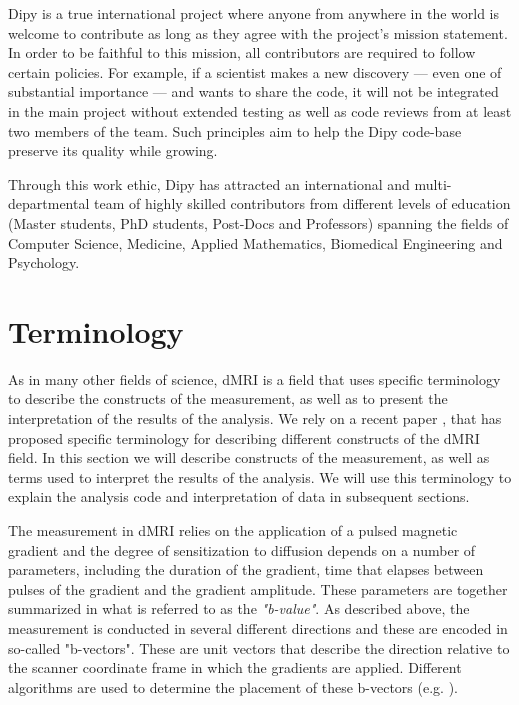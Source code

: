 \documentclass{bioinfo}
\begin{document}
Dipy is a true international project where anyone from anywhere in the world
is welcome to contribute as long as they agree with the project's mission
statement. In order to be faithful to this mission, all contributors are
required to follow certain policies. For example, if a scientist makes a new
discovery --- even one of substantial importance --- and wants to share the code,
it will not be integrated in the main project without extended testing as well
as code reviews from at least two members of the team.  Such principles
aim to help the Dipy code-base preserve its quality while growing.

Through this work ethic, Dipy has attracted an international and
multi-departmental team of highly skilled contributors from different levels
of education (Master students, PhD students, Post-Docs and Professors)
spanning the fields of Computer Science, Medicine, Applied Mathematics,
Biomedical Engineering and Psychology.


\section{Terminology}

As in many other fields of science, dMRI is a field that uses specific
terminology to describe the constructs of the measurement, as well as to
present the interpretation of the results of the analysis. We rely on a recent
paper \citep{Cote2013tractometer}, that has proposed specific terminology for
describing different constructs of the dMRI field. In this section we will
describe constructs of the measurement, as well as terms used to interpret
the results of the analysis. We will use this terminology to explain the
analysis code and interpretation of data in subsequent sections.

The measurement in dMRI relies on the application of a pulsed magnetic
gradient and the degree of sensitization to diffusion depends on a number of
parameters, including the duration of the gradient, time that elapses between
pulses of the gradient and the gradient amplitude. These parameters are
together summarized in what is referred to as the \emph{"b-value"}.  As described
above, the measurement is conducted in several different directions and these
are encoded in so-called "b-vectors". These are unit vectors that describe the
direction relative to the scanner coordinate frame in which the gradients are
applied. Different algorithms are used to determine the placement of these b-vectors
 (e.g. \citep{jones-etal:99}).
\end{document}
